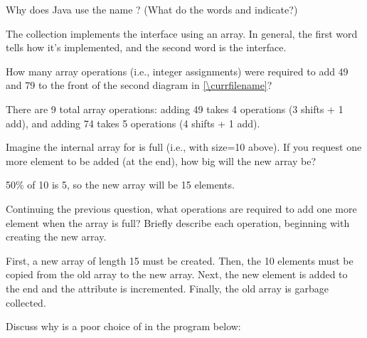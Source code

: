 

\Q Why does Java use the name ?
(What do the words  and  indicate?)

\begin{answer}
The  collection implements the  interface using an array.
In general, the first word tells how it's implemented, and the second word is the interface.
\end{answer}


%


\Q \label{arrayopers}
How many array operations (i.e., integer assignments) were required to add 49 and 79 to the front of the second diagram in \ref{\currfilename}?

\begin{answer}
There are 9 total array operations:
adding 49 takes 4 operations (3 shifts + 1 add), and adding 74 takes 5 operations (4 shifts + 1 add).
\end{answer}


\Q Imagine the internal array for  is full (i.e., with size=10 above).
If you request one more element to be added (at the end), how big will the new array be?

\begin{answer}
50\% of 10 is 5, so the new array will be 15 elements.
\end{answer}


\Q Continuing the previous question, what operations are required to add one more element when the array is full? Briefly describe each operation, beginning with creating the new array.

\begin{answer}[5em]
First, a new array of length 15 must be created.
Then, the 10 elements must be copied from the old array to the new array.
Next, the new element is added to the end and the  attribute is incremented.
Finally, the old array is garbage collected.
\end{answer}


\Q \label{ArraysAreBad}
Discuss why  is a poor choice of  in the program below:

